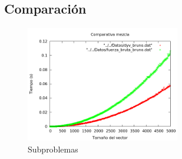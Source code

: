 \subsection{Comparaci\'on}
\begin{figure}[htb] 
\centering
	\includegraphics[width=0.6\textwidth]{../Opcional/Graficas/comparativa.png}
	\caption{Subproblemas} 
	\label{fig:perros} 
\end{figure}

